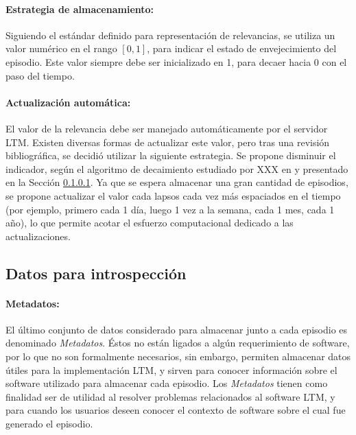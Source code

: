 \paragraph{Estrategia de almacenamiento:}
Siguiendo el estándar definido para representación de relevancias, se utiliza un valor numérico en el rango $[0, 1]$, para  indicar el estado de envejecimiento del episodio. Este valor siempre debe ser inicializado en 1, para decaer hacia 0 con el paso del tiempo.


\paragraph{Actualización automática:}
El valor de la relevancia debe ser manejado automáticamente por el servidor LTM. Existen diversas formas de actualizar este valor, pero tras una revisión bibliográfica, se decidió utilizar la siguiente estrategia. Se propone disminuir el indicador, según el algoritmo de decaimiento estudiado por XXX en \cite{} y presentado en la Sección \ref{}. Ya que se espera almacenar una gran cantidad de episodios, se propone actualizar el valor cada lapsos cada vez más espaciados en el tiempo (por ejemplo, primero cada 1 día, luego 1 vez a la semana, cada 1 mes, cada 1 año), lo que permite acotar el esfuerzo computacional dedicado a las actualizaciones.



\subsection{Datos para introspección}

\paragraph{Metadatos:}
El último conjunto de datos considerado para almacenar junto a cada episodio es denominado \textit{Metadatos}. Éstos no están ligados a algún requerimiento de software, por lo que no son formalmente necesarios, sin embargo, permiten almacenar datos útiles para la implementación LTM, y sirven para conocer información sobre el software utilizado para almacenar cada episodio. Los \textit{Metadatos} tienen como finalidad ser de utilidad al resolver problemas relacionados al software LTM, y para cuando los usuarios deseen conocer el contexto de software sobre el cual fue generado el episodio.



